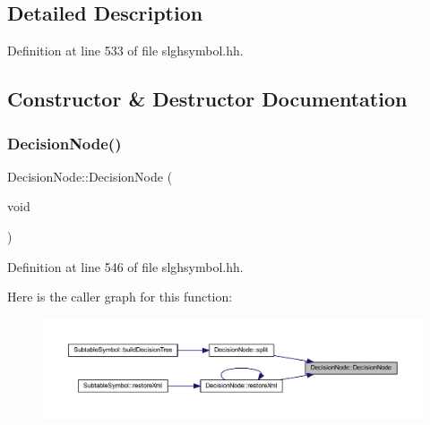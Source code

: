 \subsection{Detailed Description}


Definition at line 533 of file slghsymbol.\+hh.



\subsection{Constructor \& Destructor Documentation}
\mbox{\label{class_decision_node_a57d0d4384297f9889bf2b72301a19b34}} 
\subsubsection{\texorpdfstring{DecisionNode()}{DecisionNode()}\hspace{0.1cm}{\footnotesize\ttfamily [1/2]}}
{\footnotesize\ttfamily Decision\+Node\+::\+Decision\+Node (\begin{DoxyParamCaption}\item[{void}]{ }\end{DoxyParamCaption})\hspace{0.3cm}{\ttfamily [inline]}}



Definition at line 546 of file slghsymbol.\+hh.

Here is the caller graph for this function\+:
\nopagebreak
\begin{figure}[H]
\begin{center}
\leavevmode
\includegraphics[width=350pt]{class_decision_node_a57d0d4384297f9889bf2b72301a19b34_icgraph}
\end{center}
\end{figure}
\mbox{\label{class_decision_node_af5e60d0f279625b461b1af4080c249b7}} 
